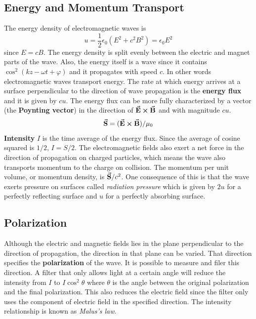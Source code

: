     \subsection*{Energy and Momentum Transport}
    The energy density of electromagnetic waves is
    \begin{equation*}
        u = \frac{1}{2}\epsilon_0(E^2 + c^2B^2) = \epsilon_0 E^2
    \end{equation*}
    since $E = cB$. The energy density is split evenly between the electric and magnet parts of the wave. Also, the energy itself is a wave since it contains $\cos^2(kz - \omega t + \varphi)$ and it propagates with speed $c$. In other words electromagnetic waves transport energy. The rate at which energy arrives at a surface perpendicular to the direction of wave propagation is the \textbf{energy flux} and it is given by $cu$. The energy flux can be more fully characterized by a vector (the \textbf{Poynting vector}) in the direction of $\va{E} \cross \va{B}$ and with magnitude $cu$.
    \begin{equation*}
        \va{S} = (\va{E} \cross \va{B})/\mu_0
    \end{equation*}
    \textbf{Intensity} $I$ is the time average of the energy flux. Since the average of cosine squared is $1/2$, $I = S / 2$.
    \newline \indent
    The electromagnetic fields also exert a net force in the direction of propagation on charged particles, which means the wave also transports momentum to the charge on collision. The momentum per unit volume, or momentum density, is $\va{S}/c^2$. One consequence of this is that the wave exerts pressure on surfaces called \textit{radiation pressure} which is given by $2u$ for a perfectly reflecting surface and $u$ for a perfectly absorbing surface.
    \subsection*{Polarization}
    Although the electric and magnetic fields lies in the plane perpendicular to the direction of propagation, the direction in that plane can be varied. That direction specifies the \textbf{polarization} of the wave. It is possible to measure and filer this direction. A filter that only allows light at a certain angle will reduce the intensity from $I$ to $I\cos^2\theta$ where $\theta$ is the angle between the original polarization and the final polarization. This also reduces the electric field since the filter only uses the component of electric field in the specified direction. The intensity relationship is known as \textit{Malus's law}.